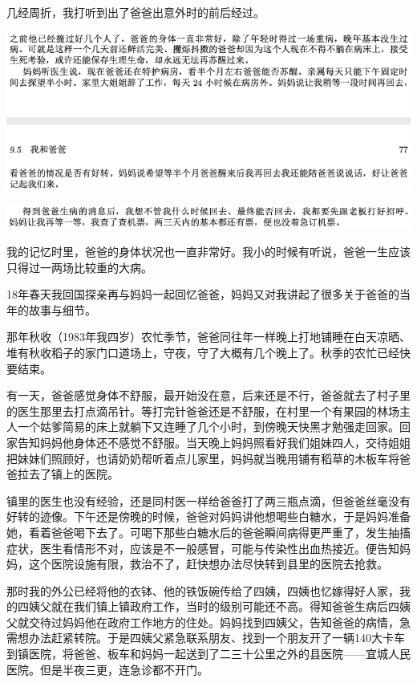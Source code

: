 \documentclass[9pt, b5paper]{article}
\begin{document}
几经周折，我打听到出了爸爸出意外时的前后经过。

\begin{center}
\includegraphics[width=.9\linewidth]{./pic/backups_plans_20210416_154642.png}
\end{center}

\begin{center}
\includegraphics[width=.9\linewidth]{./pic/backups_plans_20210416_160907.png}
\end{center}

我的记忆时里，爸爸的身体状况也一直非常好。我小的时候有听说，爸爸一生应该只得过一两场比较重的大病。

18年春天我回国探亲再与妈妈一起回忆爸爸，妈妈又对我讲起了很多关于爸爸的当年的故事与细节。 

那年秋收（1983年我四岁）农忙季节，爸爸同往年一样晚上打地铺睡在白天凉晒、堆有秋收稻子的家门口道场上，守夜，守了大概有几个晚上了。秋季的农忙已经快要结束。

有一天，爸爸感觉身体不舒服，最开始没在意，后来还是不行，爸爸就去了村子里的医生那里去打点滴吊针。等打完针爸爸还是不舒服，在村里一个有果园的林场主人一个姑爹简易的床上就躺下又连睡了几个小时，到傍晚天快黑才勉强走回家。回家告知妈妈他身体还不感觉不舒服。当天晚上妈妈照看好我们姐妹四人，交待姐姐把妹妹们照顾好，也请奶奶帮听着点儿家里，妈妈就当晚用铺有稻草的木板车将爸爸拉去了镇上的医院。

镇里的医生也没有经验，还是同村医一样给爸爸打了两三瓶点滴，但爸爸丝毫没有好转的迹像。下午还是傍晚的时候，爸爸对妈妈讲他想喝些白糖水，于是妈妈准备她，看着爸爸喝下去了。可喝下那些白糖水后的爸爸瞬间病得更严重了，发生抽搐症状，医生看情形不对，应该是不一般感冒，可能与传染性出血热接近。便告知妈妈，这个医院设施有限，救治不了，赶快想办法尽快转到县里的医院去抢救。

那时我的外公已经将他的衣钵、他的铁饭碗传给了四姨，四姨也忆嫁得好人家，我的四姨父就在我们镇上镇政府工作，当时的级别可能还不高。得知爸爸生病后四姨父就交待过妈妈他在政府工作地方的住处。妈妈找到四姨父，告知爸爸的病情，急需想办法赶紧转院。于是四姨父紧急联系朋友、找到一个朋友开了一辆140大卡车到镇医院，将爸爸、板车和妈妈一起送到了二三十公里之外的县医院——宜城人民医院。但是半夜三更，连急诊都不开门。 
\end{document}
